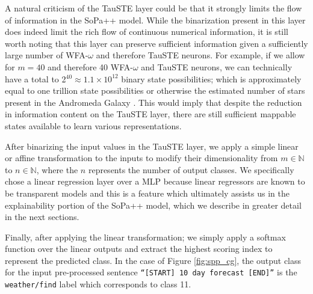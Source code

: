 A natural criticism of the TauSTE layer could be that it strongly limits the
flow of information in the SoPa++ model. While the binarization present in this
layer does indeed limit the rich flow of continuous numerical information, it is
still worth noting that this layer can preserve sufficient information given a
sufficiently large number of WFA-$\omega$ and therefore TauSTE neurons. For
example, if we allow for $m=40$ and therefore 40 WFA-$\omega$ and TauSTE
neurons, we can technically have a total to 2$^{40}\approx1.1\times10^{12}$
binary state possibilities; which is approximately equal to one trillion state
possibilities or otherwise the estimated number of stars present in the
Andromeda Galaxy \citep{10.1093/mnras/stu879}. This would imply that despite the
reduction in information content on the TauSTE layer, there are still sufficient
mappable states available to learn various representations.

After binarizing the input values in the TauSTE layer, we apply a simple linear
or affine transformation to the inputs to modify their dimensionality from $m
\in \mathbb{N}$ to $n \in \mathbb{N}$, where the $n$ represents the number of
output classes. We specifically chose a linear regression layer over a MLP
because linear regressors are known to be transparent models
\citep{arrieta2020explainable} and this is a feature which ultimately assists us
in the explainability portion of the SoPa++ model, which we describe in greater
detail in the next sections.

Finally, after applying the linear transformation; we simply apply a softmax
function over the linear outputs and extract the highest scoring index to
represent the predicted class. In the case of Figure \ref{fig:spp_cg}, the
output class for the input pre-processed sentence \texttt{``[START] 10 day
  forecast [END]''} is the \texttt{weather/find} label which corresponds to class 11.

